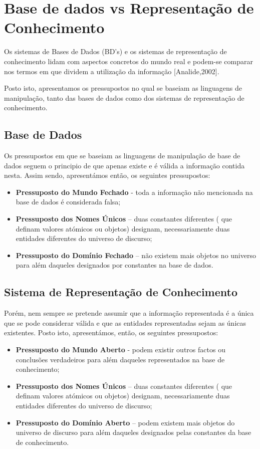\section{Base de dados vs Representação de Conhecimento}
\label{p2:bdrepreconh}

Os sistemas de Bases de Dados (BD’s) e os sistemas de representação de conhecimento lidam com aspectos concretos do mundo real e podem-se comparar nos termos em que dividem a utilização da informação [Analide,2002].

Posto isto, apresentamos os pressupostos no qual se baseiam as linguagens de manipulação, tanto das bases de dados como dos sistemas de representação de conhecimento.

\subsection{Base de Dados}
Os pressupostos em que se baseiam as linguagens de manipulação de base de dados seguem o principio de que apenas existe e é válida a informação contida nesta. Assim sendo, apresentámos então, os seguintes pressupostos:

\begin{itemize}
	\item \textbf{Pressuposto do Mundo Fechado} - toda a informação não mencionada na base de dados é considerada falsa;
	\item \textbf{Pressuposto dos Nomes Únicos} – duas constantes diferentes ( que definam valores atómicos ou objetos) designam, necessariamente duas entidades diferentes do universo de discurso; 
	\item \textbf{Pressuposto do Domínio Fechado} – não existem mais objetos no universo para além daqueles designados por constantes na base de dados.  
\end{itemize}


\subsection{Sistema de Representação de Conhecimento}

Porém, nem sempre se pretende assumir que a informação representada é a única que se pode considerar válida e que as entidades representadas sejam as únicas existentes. Posto isto, apresentámos, então, os seguintes pressupostos:

\begin{itemize}
	\item \textbf{Pressuposto do Mundo Aberto} - podem existir outros factos ou conclusões verdadeiros para além daqueles representados na base de conhecimento; 
	\item \textbf{Pressuposto dos Nomes Únicos} – duas constantes diferentes ( que definam valores atómicos ou objetos) designam, necessariamente duas entidades diferentes do universo de discurso; 
	\item \textbf{Pressuposto do Domínio Aberto} – podem existem mais objetos do universo de discurso para além daqueles designados pelas constantes da base de conhecimento.  
\end{itemize}

